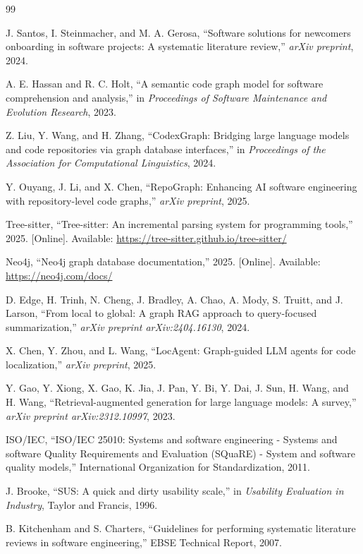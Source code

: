 \documentclass[conference]{IEEEtran}
\begin{document}
\begin{thebibliography}{99}

J. Santos, I. Steinmacher, and M. A. Gerosa, ``Software solutions for newcomers onboarding in software projects: A systematic literature review,'' \emph{arXiv preprint}, 2024.

A. E. Hassan and R. C. Holt, ``A semantic code graph model for software comprehension and analysis,'' in \emph{Proceedings of Software Maintenance and Evolution Research}, 2023.

Z. Liu, Y. Wang, and H. Zhang, ``CodexGraph: Bridging large language models and code repositories via graph database interfaces,'' in \emph{Proceedings of the Association for Computational Linguistics}, 2024.

Y. Ouyang, J. Li, and X. Chen, ``RepoGraph: Enhancing AI software engineering with repository-level code graphs,'' \emph{arXiv preprint}, 2025.

Tree-sitter, ``Tree-sitter: An incremental parsing system for programming tools,'' 2025. [Online]. Available: \url{https://tree-sitter.github.io/tree-sitter/}

Neo4j, ``Neo4j graph database documentation,'' 2025. [Online]. Available: \url{https://neo4j.com/docs/}

D. Edge, H. Trinh, N. Cheng, J. Bradley, A. Chao, A. Mody, S. Truitt, and J. Larson, ``From local to global: A graph RAG approach to query-focused summarization,'' \emph{arXiv preprint arXiv:2404.16130}, 2024.

X. Chen, Y. Zhou, and L. Wang, ``LocAgent: Graph-guided LLM agents for code localization,'' \emph{arXiv preprint}, 2025.

Y. Gao, Y. Xiong, X. Gao, K. Jia, J. Pan, Y. Bi, Y. Dai, J. Sun, H. Wang, and H. Wang, ``Retrieval-augmented generation for large language models: A survey,'' \emph{arXiv preprint arXiv:2312.10997}, 2023.

ISO/IEC, ``ISO/IEC 25010: Systems and software engineering - Systems and software Quality Requirements and Evaluation (SQuaRE) - System and software quality models,'' International Organization for Standardization, 2011.

J. Brooke, ``SUS: A quick and dirty usability scale,'' in \emph{Usability Evaluation in Industry}, Taylor and Francis, 1996.

B. Kitchenham and S. Charters, ``Guidelines for performing systematic literature reviews in software engineering,'' EBSE Technical Report, 2007.

\end{thebibliography}
\end{document}
